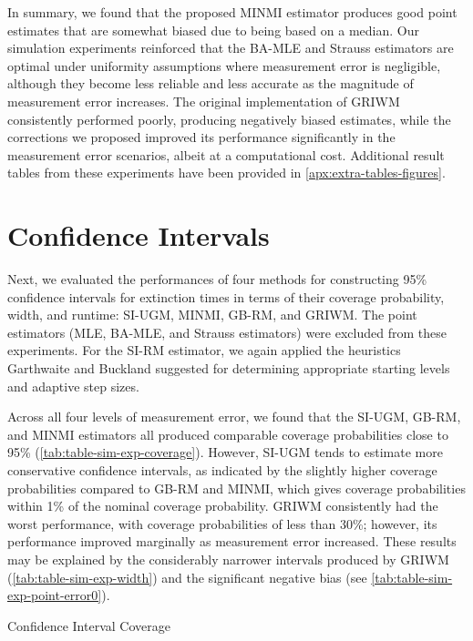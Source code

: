 In summary, we found that the proposed MINMI estimator produces good point estimates that are somewhat biased due to being based on a median. Our simulation experiments reinforced that the BA-MLE and Strauss estimators are optimal under uniformity assumptions where measurement error is negligible, although they become less reliable and less accurate as the magnitude of measurement error increases. The original implementation of GRIWM consistently performed poorly, producing negatively biased estimates, while the corrections we proposed improved its performance significantly in the measurement error scenarios, albeit at a computational cost. Additional result tables from these experiments have been provided in \autoref{apx:extra-tables-figures}.

\section{Confidence Intervals}

Next, we evaluated the performances of four methods for constructing 95\% confidence intervals for extinction times in terms of their coverage probability, width, and runtime: SI-UGM, MINMI, GB-RM, and GRIWM. The point estimators (MLE, BA-MLE, and Strauss estimators) were excluded from these experiments. For the SI-RM estimator, we again applied the heuristics Garthwaite and Buckland suggested for determining appropriate starting levels and adaptive step sizes.

Across all four levels of measurement error, we found that the SI-UGM, GB-RM, and MINMI estimators all produced comparable coverage probabilities close to 95\% (\autoref{tab:table-sim-exp-coverage}). However, SI-UGM tends to estimate more conservative confidence intervals, as indicated by the slightly higher coverage probabilities compared to GB-RM and MINMI, which gives coverage probabilities within 1\% of the nominal coverage probability. GRIWM consistently had the worst performance, with coverage probabilities of less than 30\%; however, its performance improved marginally as measurement error increased. These results may be explained by the considerably narrower intervals produced by GRIWM (\autoref{tab:table-sim-exp-width}) and the significant negative bias (see \autoref{tab:table-sim-exp-point-error0}).
\begin{table}[ht]
    \centering
    \caption{Confidence Interval Coverage}
    
    \label{tab:table-sim-exp-coverage}
\end{table}

